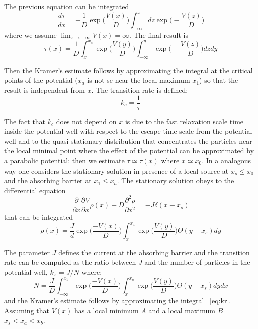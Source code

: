 The previous equation can be integrated
$$
\frac{d\tau}{dx} = - \frac{1}{D} \exp \biggl(\frac{V(x)}{D}\biggr) \int_{-\infty}^x dz \exp \biggl(-\frac{V(z)}{D}\biggr)
$$
where we assume $\lim_{x\to - \infty} V(x) = \infty$. The final result is 
\begin{equation}
\tau(x) = \frac{1}{D} \int_x^{x_a} \exp \biggl(\frac{V(y)}{D}\biggr) \int _{-\infty}^y \exp\biggl(-\frac{V(z)}{D}\biggr) dzdy
\end{equation}

Then the Kramer's estimate follows by approximating the integral at the critical points of the potential ($x_a$ is not se near the local maximum $x_1$) so that the result is independent from $x$. The transition rate is defined:
$$
k_c = \frac{1}{\tau}
$$

The fact that $k_c$ does not depend on $x$ is due to the fast relaxation scale time inside the potential well with respect to the escape time scale from the potential well and to the quasi-stationary distribution that concentrates the particles near the local minimal point where the effect of the potential can be approximated by a parabolic potential: then we estimate $\tau \simeq \tau(x)$ where $x \simeq x_0$.
In a analogous way one considers the stationary solution in presence of a local source at $x_s \le x_0 $ and the absorbing barrier at $x_1 \le x_a$. The stationary solution obeys to the differential equation 
$$
\frac{\partial}{\partial x}\frac{\partial V}{\partial x} \rho(x) + D \frac{\partial^2 \rho}{\partial x^2} = -J \delta(x-x_s)
$$ 
that can be integrated 
$$
\rho(x) = \frac{J}{d} \exp \biggl(\frac{-V(x)}{D}\biggr)\int_x^{x_a} \exp \biggl(\frac{V(y)}{D}\biggr) \Theta(y-x_s) dy
$$

The parameter $J$ defines the current at the absorbing barrier and the transition rate can be computed as the ratio between $J$ and the number of particles in the potential well, $k_x = J/N$ where:
\begin{equation}
N = \frac{J}{D} \int_{-\infty}^{x_1} \exp \biggl(\frac{-V(x)}{D} \biggr) \int_x^{x_a} \exp \biggl(\frac{V(y)}{D} \biggr) \Theta (y-x_s) dydx
\label{eq:kr}
\end{equation}
and the Kramer's estimate follows by approximating the integral ~\ref{eq:kr}. Assuming that $V(x)$ has a local minimum $A$ and a local maximum $B$ $x_s < x_a <x_b $. 
